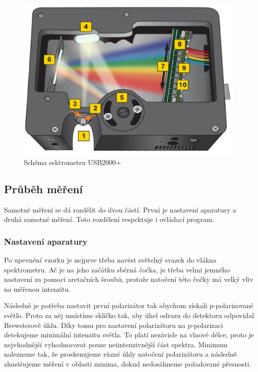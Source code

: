 \begin{figure}
    \begin{center}
    \includegraphics[width=5in]{img/usb4openbench.eps}
    \end{center}
    \caption{Schéma sektrometru USB2000+ \cite{USB2000}}
    \label{USB2000+ schema}
\end{figure}

\subsection{Průběh měření}
Samotné měření se dá rozdělit do dvou částí. První je nastavení aparatury a druhá samotné měření. Toto rozdělení respektuje i ovládací program.
\subsubsection{Nastavení aparatury}
Po upevnění vzorku je nejprve třeba navést světelný svazek do vlákna spektrometru. Ač je na jeho začátku sběrná čočka, je třeba velmi jemného nastavení za pomoci aretačních šroubů, protože natočení této čočky má velký vliv na měřenou intenzitu.

Následně je potřeba nastavit první polarizátor tak abychom získali p-polarizované světlo. Proto za něj umístíme sklíčko tak, aby úhel odrazu do detektoru odpovídal Brewsterově úhlu. Díky tomu pro nastavení polarizátoru na p-polarizaci detekujeme minimální intenzitu světla. To platí nezávisle na vlnové délce, proto je nejvhodnější vyhodnocovat pouze neiintenzivnější část spektra. Minimum nalezneme tak, že proskenujeme různé úhly natočení polarizátoru a následně zhustšujeme měření v oblasti minima, dokud nedosáhneme požadované přesnosti.

